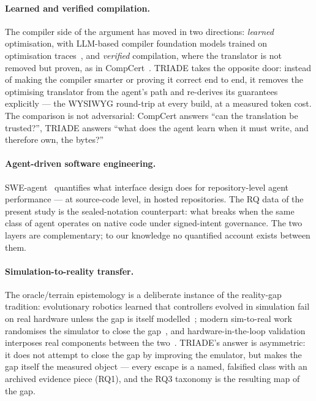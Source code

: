 \documentclass[11pt,a4paper]{article}
\begin{document}
\paragraph{Learned and verified compilation.} The compiler side of the
argument has moved in two directions: \emph{learned} optimisation, with
LLM-based compiler foundation models trained on optimisation
traces~\cite{cummins2024llmcompiler}, and \emph{verified} compilation,
where the translator is not removed but proven, as in
CompCert~\cite{leroycompcert}. TRIADE takes the opposite door: instead
of making the compiler smarter or proving it correct end to end, it
removes the optimising translator from the agent's path and re-derives
its guarantees explicitly --- the WYSIWYG round-trip at every build,
at a measured token cost. The comparison is not adversarial: CompCert
answers ``can the translation be trusted?'', TRIADE answers ``what does
the agent learn when it must write, and therefore own, the bytes?''

\paragraph{Agent-driven software engineering.} SWE-agent~\cite{yang2024sweagent}
quantifies what interface design does for repository-level agent
performance --- at source-code level, in hosted repositories. The RQ
data of the present study is the sealed-notation counterpart: what
breaks when the same class of agent operates on native code under
signed-intent governance. The two layers are complementary; to our
knowledge no quantified account exists between them.

\paragraph{Simulation-to-reality transfer.} The oracle/terrain
epistemology is a deliberate instance of the reality-gap tradition:
evolutionary robotics learned that controllers evolved in simulation
fail on real hardware unless the gap is itself modelled~\cite{jakobi1995reality};
modern sim-to-real work randomises the simulator to close the
gap~\cite{peng2018simtoreal}, and hardware-in-the-loop validation
interposes real components between the two~\cite{bacic2005hil}. TRIADE's
answer is asymmetric: it does not attempt to close the gap by improving
the emulator, but makes the gap itself the measured object --- every
escape is a named, falsified class with an archived evidence piece
(RQ1), and the RQ3 taxonomy is the resulting map of the gap.
\end{document}
